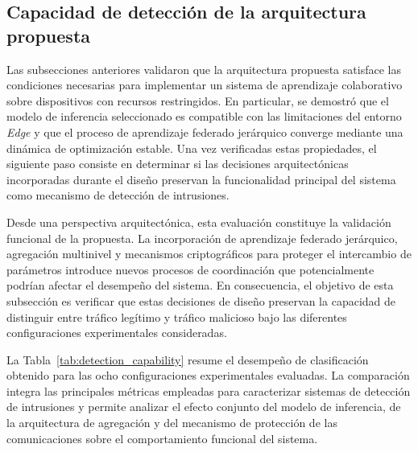 \documentclass[journal,article,submit,moreauthors]{Definitions/mdpi}
\begin{document}
\subsection{Capacidad de detección de la arquitectura propuesta}
Las subsecciones anteriores validaron que la arquitectura propuesta satisface las condiciones necesarias para implementar un sistema de aprendizaje colaborativo sobre dispositivos con recursos restringidos. En particular, se demostró que el modelo de inferencia seleccionado es compatible con las limitaciones del entorno \textit{Edge} y que el proceso de aprendizaje federado jerárquico converge mediante una dinámica de optimización estable. Una vez verificadas estas propiedades, el siguiente paso consiste en determinar si las decisiones arquitectónicas incorporadas durante el diseño preservan la funcionalidad principal del sistema como mecanismo de detección de intrusiones.

Desde una perspectiva arquitectónica, esta evaluación constituye la validación funcional de la propuesta. La incorporación de aprendizaje federado jerárquico, agregación multinivel y mecanismos criptográficos para proteger el intercambio de parámetros introduce nuevos procesos de coordinación que potencialmente podrían afectar el desempeño del sistema. En consecuencia, el objetivo de esta subsección es verificar que estas decisiones de diseño preservan la capacidad de distinguir entre tráfico legítimo y tráfico malicioso bajo las diferentes configuraciones experimentales consideradas.

La Tabla~\ref{tab:detection_capability} resume el desempeño de clasificación obtenido para las ocho configuraciones experimentales evaluadas. La comparación integra las principales métricas empleadas para caracterizar sistemas de detección de intrusiones y permite analizar el efecto conjunto del modelo de inferencia, de la arquitectura de agregación y del mecanismo de protección de las comunicaciones sobre el comportamiento funcional del sistema.
\end{document}
